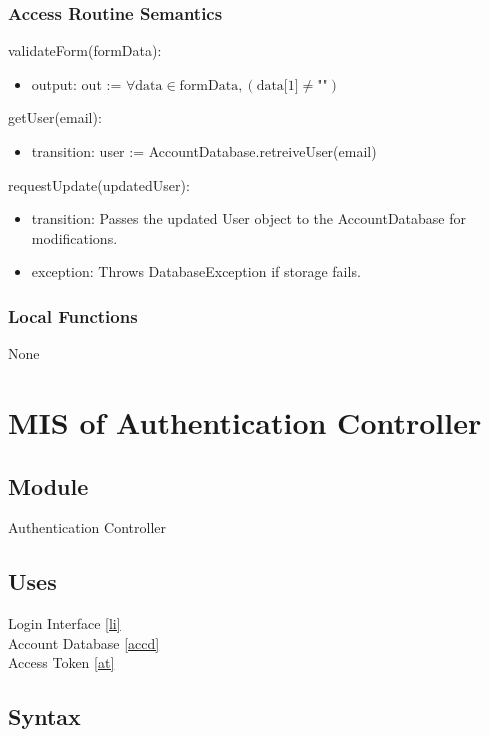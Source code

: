 \documentclass[12pt, titlepage]{article}
\begin{document}
\subsubsection{Access Routine Semantics}
\noindent validateForm(formData):
\begin{itemize}
\item output: out := $\forall \text{data} \in \text{formData}, (\text{data[1]} \neq \text{""})$
\end{itemize}

\noindent getUser(email):
\begin{itemize}
\item transition: user := AccountDatabase.retreiveUser(email)
\end{itemize}

\noindent requestUpdate(updatedUser):
\begin{itemize}
\item transition: Passes the updated User object to the AccountDatabase for modifications.
\item exception: Throws DatabaseException if storage fails.
\end{itemize}

\subsubsection{Local Functions}
None

\section{MIS of Authentication Controller} \label{ac}

\subsection{Module}

Authentication Controller

\subsection{Uses}

Login Interface \ref{li}\\
Account Database \ref{accd} \\
Access Token \ref{at} \\

\subsection{Syntax}
\end{document}
